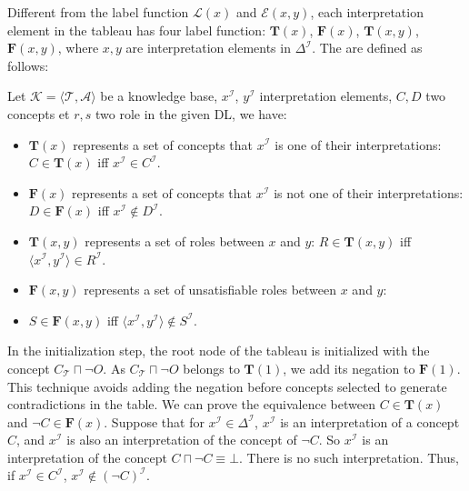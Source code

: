 \documentclass{article}
\begin{document}
Different from the label function $\mathcal{L}(x)$ and $\mathcal{E}(x,y)$, each interpretation element in the tableau has four label function:
$\mathbf{T}(x)$, $\mathbf{F}(x)$, $\mathbf{T}(x,y)$, $\mathbf{F}(x,y)$,
where  $x,y$ are interpretation elements in $\Delta^\mathcal{I}$.
The are defined as follows:

 Let $\mathcal{K}=\langle \mathcal{T},\mathcal{A}\rangle$ be a knowledge base,  $x^{\mathcal{I}}$, $y^{\mathcal{I}}$ interpretation elements, $C,D$  two concepts et $r, s$ two role in the given DL,
 we have:
 \begin{itemize}
 \item   $\mathbf{T}(x)$ represents a set of concepts that $x^\mathcal{I}$ is one of their interpretations:
   $C\in \mathbf{T}(x)$ iff $x^\mathcal{I} \in C^\mathcal{I}$.
 \item   $\mathbf{F}(x)$ represents a set of concepts that $x^\mathcal{I}$ is not one of their interpretations:
  $D\in \mathbf{F}(x)$ iff $x^\mathcal{I} \notin D^\mathcal{I}$.
 \item   $\mathbf{T}(x,y)$ represents a set of roles between $x$ and $y$:
  $R\in \mathbf{T}(x,y)$ iff $\langle x^\mathcal{I}, y^\mathcal{I} \rangle \in R^\mathcal{I}$.
 \item   $\mathbf{F}(x,y)$ represents a set of unsatisfiable roles between $x$ and $y$:
 \item $S\in \mathbf{F}(x,y)$ iff $\langle x^\mathcal{I}, y^\mathcal{I} \rangle \notin S^\mathcal{I}$.
 \end{itemize}
 
 In the initialization step, the root node of the tableau is initialized with the concept $C_\mathcal{T}\sqcap \neg O$.
 As $C_\mathcal{T}\sqcap \neg O$ belongs to $\mathbf{T}(1)$, we add its negation to $\mathbf{F}(1)$.
 This technique avoids adding the negation before concepts selected to generate contradictions in the table.
 We can prove the equivalence between $ C\in \mathbf{T}(x) $ and $\neg C \in \mathbf {F}(x)$. Suppose that for $x^\mathcal{I} \in \Delta^\mathcal{I}$, $x^\mathcal{I}$ is an interpretation of a concept $C$,
and $x^\mathcal{I}$ is also an interpretation of the concept of $\neg C$. So $x^\mathcal{I}$ is an interpretation of the concept $C\sqcap\neg C\equiv \bot$. There is no such interpretation.
Thus, if $x^\mathcal{I}\in C^\mathcal{I}$, $x^\mathcal{I} \notin(\neg C)^\mathcal{I}$.
 
\end{document}
